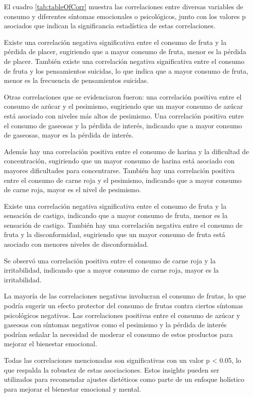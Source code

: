 \documentclass[man]{apa7}
\begin{document}
	El cuadro \ref{tab:tableOfCorr} muestra las correlaciones entre diversas variables de consumo y
	diferentes síntomas emocionales o psicológicos, junto con los valores p
	asociados que indican la significancia estadística de estas
	correlaciones.

	Existe una correlación negativa significativa entre el consumo de fruta
	y la pérdida de placer, sugiriendo que a mayor consumo de fruta, menor
	es la pérdida de placer. También existe una correlación negativa
	significativa entre el consumo de fruta y los pensamientos suicidas, lo
	que indica que a mayor consumo de fruta, menor es la frecuencia de
	pensamientos suicidas.

	Otras correlaciones que se evidenciaron fueron: una correlación positiva
	entre el consumo de azúcar y el pesimismo, sugiriendo que un mayor
	consumo de azúcar está asociado con niveles más altos de pesimismo. Una
	correlación positiva entre el consumo de gaseosas y la pérdida de
	interés, indicando que a mayor consumo de gaseosas, mayor es la pérdida
	de interés.

	Además hay una correlación positiva entre el consumo de harina y la
	dificultad de concentración, sugiriendo que un mayor consumo de harina
	está asociado con mayores dificultades para concentrarse. También hay
	una correlación positiva entre el consumo de carne roja y el pesimismo,
	indicando que a mayor consumo de carne roja, mayor es el nivel de
	pesimismo.

	Existe una correlación negativa significativa entre el consumo de fruta
	y la sensación de castigo, indicando que a mayor consumo de fruta, menor
	es la sensación de castigo. También hay una correlación negativa entre
	el consumo de fruta y la disconformidad, sugiriendo que un mayor consumo
	de fruta está asociado con menores niveles de disconformidad.

	Se observó una correlación positiva entre el consumo de carne roja y la
	irritabilidad, indicando que a mayor consumo de carne roja, mayor es la
	irritabilidad.

	La mayoría de las correlaciones negativas involucran el consumo de
	frutas, lo que podría sugerir un efecto protector del consumo de frutas
	contra ciertos síntomas psicológicos negativos. Las correlaciones
	positivas entre el consumo de azúcar y gaseosas con síntomas negativos
	como el pesimismo y la pérdida de interés podrían señalar la necesidad
	de moderar el consumo de estos productos para mejorar el bienestar
	emocional.

	Todas las correlaciones mencionadas son significativas con un valor p
	\textless{} 0.05, lo que respalda la robustez de estas asociaciones.
	Estos insights pueden ser utilizados para recomendar ajustes dietéticos
	como parte de un enfoque holístico para mejorar el bienestar emocional y
	mental.
\end{document}
